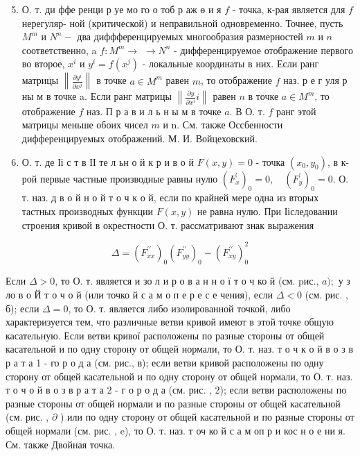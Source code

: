 \documentclass[10pt]{article}
\begin{document}
\begin{enumerate}

  \setcounter{enumi}{4}

  \item О. т. ди ффе ренци р уе мо го о тоб р аж ө и я $f$ - точка, к-рая является для $f$ нерегуляр- ной (критической) и неправильной одновременно. Точнее, пусть $M^{m}$ и $N^{n}-$ два диффференцируемых многообразия размерностей $m$ и $n$ соответственно, a $f: M^{m} \rightarrow$ $\rightarrow N^{n}$ - дифференцируемое отображение первого во второе, $x^{i}$ и $y^{i}=f\left(x^{j}\right)$ - локальные координаты в них. Если ранг матрицы $\left\|\frac{\partial y^{i}}{\partial x^{j}}\right\|$ в точке $a \in M^{m}$ равен $m$, то отображение $f$ наз. р е г уля р ны м в точке a. Если ранг матрицы $\left\|\frac{\partial y}{\partial x^{i}} i\right\|$ равен $n$ в точке $a \in M^{m}$, то отображение $f$ наз. П р а в и л ь н ы м в точке $a$. В О. т. $f$ ранг этой матрицы меньше обоих чисел $m$ и n. См. также Оссбенности дифференцируемых отображений. М. И. Войцеховский.



  \item О. т. де Іі с т в ІІ те л ьн о й к р и в о й $F(x, y)=0$ - точка $\left(x_{0}, y_{0}\right)$, в к-рой первые частные производные равны нулю $\left(F_{x}^{\prime}\right)_{0}=0, \quad\left(F_{y}^{\prime}\right)_{0}=0$. О. т. наз. д в о й н о й т о ч к о й, если по крайней мере одна из вторых тастных производных функции $F(x, y)$ не равна нулю. При Ііследовании строения кривой в окрестности О. т. рассматривают знак выражения



\end{enumerate}



\[

\Delta=\left(F_{x x}^{\prime \prime}\right)_{0}\left(F_{y y}^{\prime \prime}\right)_{0}-\left(F_{x y}^{\prime \prime}\right)_{0}^{2}

\]



Если $\Delta>0$, то О. т. является и зо л и р о в а н н о ї т о ч ко й (см. pис., $a) ;$ у з ло в о Й т о ч о й (или точко й с а м о п е р е с е чения), если $\Delta<0$ (см. рис. , б); если $\Delta=0$, то О. т. является либо изолированной точкой, либо характеризуется тем, что различные ветви кривой имеют в этой точке общую касательную. Если ветви кривої расположены по разные стороны от общей касательной и по одну сторону от общей нормали, то О. т. наз. т о ч к о й в о з в р а т а 1 - го р о д а (см. рис., в); если ветви кривой расположены по одну сторону от общей касательной и по одну сторону от общей нормали, то О. т. наз. т о ч о й в о з в р а т а 2 - г о р о д а (см. рис. , 2); если ветви расположены по разные стороны от общей нормали и по разные стороны от общей касательной (см. рис. , $\partial$ ) или по одну сторону от общей касательной и по разные стороны от общей нормали (см. рис. , e), то О. т. наз. т оч ко й с а м оп р и кос н о е ни я. См. также Двойная точка.
\end{document}
